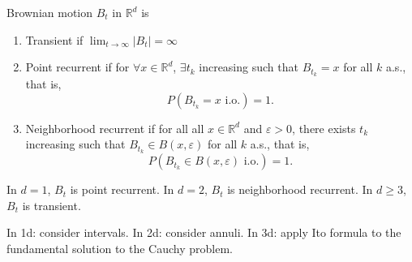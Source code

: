 \begin{definition}
	Brownian motion $B_t$ in $\mathbb{R}^d$ is
	\begin{enumerate}
		\item Transient if $\lim_{t \to \infty} |B_t| = \infty $
		\item Point recurrent if for $\forall  x \in \mathbb{R}^d$, $\exists  t_k$ increasing such that $B_{t_k} = x$ for all $k$ a.s., that is, 
			\[
				P\left( B_{t_k} = x \text{ i.o.} \right) = 1
			.\] 
		\item Neighborhood recurrent if for all all $x \in \mathbb{R}^d$ and $\varepsilon>0$, there exists $t_k $ increasing such that $B_{t_k} \in B(x, \varepsilon)$ for all $k$ a.s., that is,
			\[
				P\left( B_{t_k} \in  B(x, \varepsilon) \text{ i.o.} \right) = 1
			.\] 
	\end{enumerate}
\end{definition}

\begin{theorem}
	In $d = 1$, $B_t$ is point recurrent. In  $d = 2$, $B_t$ is neighborhood recurrent. In  $d \ge 3$, $B_t$ is transient.
\end{theorem}
In 1d: consider intervals.
In 2d: consider annuli.
In 3d: apply Ito formula to the fundamental solution to the Cauchy problem. 
